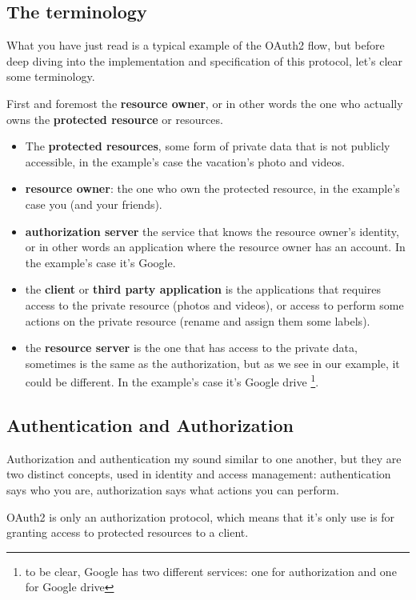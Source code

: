 \documentclass[11pt]{style}
\begin{document}
\subsection{The terminology}
What you have just read is a typical example of the OAuth2 flow, but before deep
diving into the implementation and specification of this protocol, let's clear
some terminology.

First and foremost the \textbf{resource owner}, or in other words the one who
actually owns the \textbf{protected resource} or resources.

\begin{itemize}
    \item The \textbf{protected resources}, some form of private data that is
        not publicly accessible, in the example's case the vacation's photo and
        videos.
    \item \textbf{resource owner}: the one who own the protected resource, in
        the example's case you (and your friends).
    \item \textbf{authorization server} the service that knows the resource
        owner's identity, or in other words an application where the resource
        owner has an account. In the example's case it's Google.
    \item the \textbf{client} or \textbf{third party application} is the
        applications that requires access to the private resource (photos and
        videos), or access to perform some actions on the private resource
        (rename and assign them some labels).
    \item the \textbf{resource server} is the one that has access to the private
        data, sometimes is the same as the authorization, but as we see in our
        example, it could be different.
        In the example's case it's Google drive \footnote{to be clear, Google
        has two different services: one for authorization and one for Google
        drive}.
\end{itemize}

\subsection{Authentication and Authorization}
Authorization and authentication my sound similar to one another, but they are
two distinct concepts, used in identity and access management:
authentication says who you are, authorization says what actions you can
perform.

OAuth2 is only an authorization protocol, which means that it's only use is for
granting access to protected resources to a client.
\end{document}
